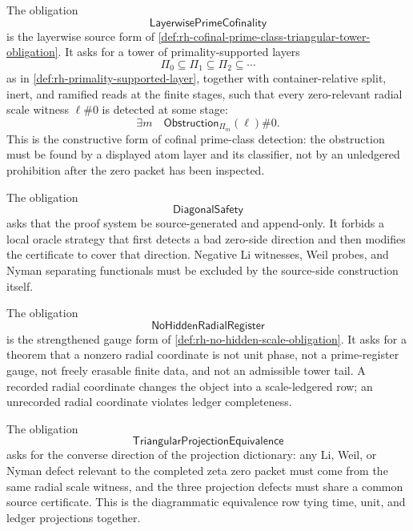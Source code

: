 \begin{definition}
\label{def:rh-layerwise-prime-cofinality-obligation}
The obligation
$$
\mathsf{LayerwisePrimeCofinality}
$$
is the layerwise source form of
\autoref{def:rh-cofinal-prime-class-triangular-tower-obligation}. It asks
for a tower of primality-supported layers
$$
\Pi_0\subseteq\Pi_1\subseteq\Pi_2\subseteq\cdots
$$
as in \autoref{def:rh-primality-supported-layer}, together with
container-relative split, inert, and ramified reads at the finite stages,
such that every zero-relevant radial scale witness $\ell\#0$ is detected
at some stage:
$$
\exists m\quad
\mathsf{Obstruction}_{\Pi_m}(\ell)\#0.
$$
This is the constructive form of cofinal prime-class detection: the
obstruction must be found by a displayed atom layer and its classifier,
not by an unledgered prohibition after the zero packet has been
inspected.
\end{definition}

\begin{definition}
\label{def:rh-diagonal-safety-obligation}
The obligation
$$
\mathsf{DiagonalSafety}
$$
asks that the proof system be source-generated and append-only. It
forbids a local oracle strategy that first detects a bad zero-side
direction and then modifies the certificate to cover that direction.
Negative Li witnesses, Weil probes, and Nyman separating functionals must
be excluded by the source-side construction itself.
\end{definition}

\begin{definition}
\label{def:rh-no-hidden-radial-register-obligation}
The obligation
$$
\mathsf{NoHiddenRadialRegister}
$$
is the strengthened gauge form of
\autoref{def:rh-no-hidden-scale-obligation}. It asks for a theorem that a
nonzero radial coordinate is not unit phase, not a prime-register gauge,
not freely erasable finite data, and not an admissible tower tail. A
recorded radial coordinate changes the object into a scale-ledgered row;
an unrecorded radial coordinate violates ledger completeness.
\end{definition}

\begin{definition}
\label{def:rh-triangular-projection-equivalence-obligation}
The obligation
$$
\mathsf{TriangularProjectionEquivalence}
$$
asks for the converse direction of the projection dictionary: any Li,
Weil, or Nyman defect relevant to the completed zeta zero packet must
come from the same radial scale witness, and the three projection
defects must share a common source certificate. This is the diagrammatic
equivalence row tying time, unit, and ledger projections together.
\end{definition}

